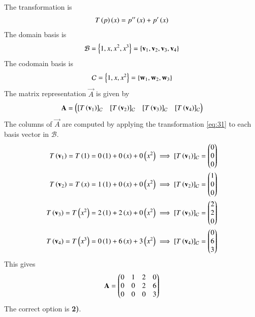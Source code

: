 \documentclass[journal]{IEEEtran}
\begin{document}
The transformation is 
\begin{align}
    T\left(p\right)\left(x\right) = p''\left(x\right) + p'\left(x\right) \label{eq:31}
\end{align}
The domain basis is 
\begin{align}
    \mathcal{B} = \left\{1, x, x^2, x^3\right\} = \left\{\mathbf{v}_1, \mathbf{v}_2, \mathbf{v}_3, \mathbf{v}_4\right\}
\end{align}
The codomain basis is 
\begin{align}
    \mathcal{C} = \left\{1, x, x^2\right\} = \left\{\mathbf{w}_1, \mathbf{w}_2, \mathbf{w}_3\right\}
\end{align}
The matrix representation $\vec{A}$ is given by
\begin{align}
    \mathbf{A} = \begin{pmatrix} [T\left(\mathbf{v}_1\right)]_\mathcal{C} & [T\left(\mathbf{v}_2\right)]_\mathcal{C} & [T\left(\mathbf{v}_3\right)]_\mathcal{C} & [T\left(\mathbf{v}_4\right)]_\mathcal{C} \end{pmatrix}
\end{align}
The columns of $\vec{A}$ are computed by applying the transformation \eqref{eq:31} to each basis vector in $\mathcal{B}$.
\begin{align}
    T\left(\mathbf{v}_1\right) = T\left(1\right) &= 0\left(1\right) + 0\left(x\right) + 0\left(x^2\right) \implies [T\left(\mathbf{v}_1\right)]_\mathcal{C} = \begin{pmatrix}0 \\ 0 \\ 0\end{pmatrix} \\
    T\left(\mathbf{v}_2\right) = T\left(x\right) &= 1\left(1\right) + 0\left(x\right) + 0\left(x^2\right) \implies [T\left(\mathbf{v}_2\right)]_\mathcal{C} = \begin{pmatrix}1 \\ 0 \\ 0\end{pmatrix} \\
    T\left(\mathbf{v}_3\right) = T\left(x^2\right) &= 2\left(1\right) + 2\left(x\right) + 0\left(x^2\right) \implies [T\left(\mathbf{v}_3\right)]_\mathcal{C} = \begin{pmatrix}2 \\ 2 \\ 0\end{pmatrix} \\
    T\left(\mathbf{v}_4\right) = T\left(x^3\right) &= 0\left(1\right) + 6\left(x\right) + 3\left(x^2\right) \implies [T\left(\mathbf{v}_4\right)]_\mathcal{C} = \begin{pmatrix}0 \\ 6 \\ 3\end{pmatrix}
\end{align}
This gives
\begin{align}
    \mathbf{A} = \begin{pmatrix}0 & 1 & 2 & 0 \\ 0 & 0 & 2 & 6 \\ 0 & 0 & 0 & 3\end{pmatrix}
\end{align}
The correct option is \textbf{2)}.
\end{document}
